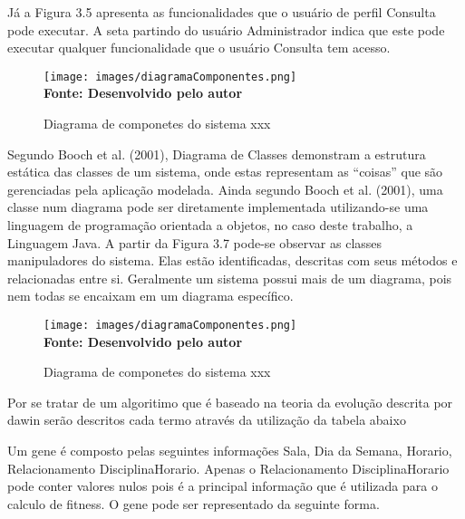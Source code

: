 Já a Figura 3.5 apresenta as funcionalidades que o usuário de perfil Consulta pode
executar. A seta partindo do usuário Administrador indica que este pode executar qualquer
funcionalidade que o usuário Consulta tem acesso.

\begin{figure}[!htb]
\caption[Diagrama de componetes do sistema xxx]{Diagrama de componetes do sistema xxx}
\label{fig:figura1}
\centering
\texttt{[image: images/diagramaComponentes.png]}
\\ \textbf{\footnotesize Fonte: Desenvolvido pelo autor}
\end{figure}




Segundo Booch et al. (2001), Diagrama de Classes demonstram a estrutura estática
das classes de um sistema, onde estas representam as “coisas” que são gerenciadas pela
aplicação modelada. Ainda segundo Booch et al. (2001), uma classe num diagrama pode
ser diretamente implementada utilizando-se uma linguagem de programação orientada a
objetos, no caso deste trabalho, a Linguagem Java.
A partir da Figura 3.7 pode-se observar as classes manipuladores do sistema. Elas
estão identificadas, descritas com seus métodos e relacionadas entre si. Geralmente um
sistema possui mais de um diagrama, pois nem todas se encaixam em um diagrama
específico.

\begin{figure}[!htb]
\caption[Diagrama de componetes do sistema xxx]{Diagrama de componetes do sistema xxx}
\label{fig:figura1}
\centering
\texttt{[image: images/diagramaComponentes.png]}
\\ \textbf{\footnotesize Fonte: Desenvolvido pelo autor}
\end{figure}



Por se tratar de um algoritimo que é baseado na teoria da evolução descrita por dawin \cite{darwin} serão descritos cada termo através da utilização da tabela abaixo 


Um gene é composto pelas seguintes informações Sala, Dia da Semana, Horario, Relacionamento DisciplinaHorario. Apenas o Relacionamento DisciplinaHorario pode conter valores nulos pois é a principal informação que é utilizada para o calculo de fitness. O gene pode ser representado da seguinte forma.

